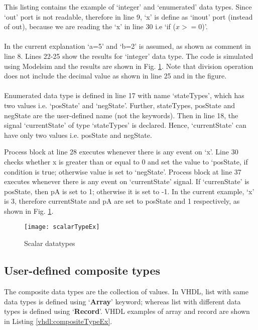 \begin{explanation}
	This listing contains the example of `integer' and `enumerated' data types. Since `out' port is not readable, therefore in line 9, `x' is define as `inout' port (instead of out), because we are reading the `x' in line 30 i.e `if ($x>=0$)'.
	\\ \\
	In the current explanation `a=5' and `b=2' is assumed, as shown as comment in line 8. Lines 22-25 show the results for `integer' data type. The code is simulated using Modelsim and the results are shown in Fig. \ref{fig:scalarTypeEx}.  Note that division operation does not include the decimal value as shown in line 25 and in the figure.
	\\ \\
	Enumerated data type is defined in line 17 with name `stateTypes', which has two values i.e. `posState' and `negState'. Further, stateTypes, posState and negState are the user-defined name (not the keywords). Then in line 18, the signal `currentState' of type `stateTypes' is declared. Hence, `currentState' can have only two values i.e. posState and negState. 
	
	Process block at line 28 executes whenever there is any event on `x'. Line 30 checks whether x is greater than or equal to 0 and set the value to `posState, if condition is true; otherwise value is set to `negState'. Process block at line 37 executes whenever there is any event on `currentState' signal. If `currenState' is posState, then pA is set to 1; otherwise it is set to -1. In the current example, `x' is 3, therefore currentState and pA are set to posState and 1 respectively, as shown in Fig. \ref{fig:scalarTypeEx}.
	
	
\end{explanation}



\begin{figure}[!h]
	\centering
	\texttt{[image: scalarTypeEx]}
	\caption{Scalar datatypes}
	\label{fig:scalarTypeEx}
\end{figure}

\subsection{User-defined composite types}
The composite data types are the collection of values. In VHDL, list with same data types is defined using `\textbf{Array}' keyword; whereas list with different data types is defined using `\textbf{Record}'. VHDL examples of array and record are shown in Listing \ref{vhdl:compositeTypeEx}.

